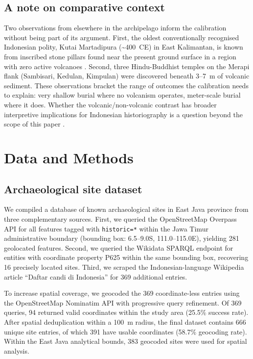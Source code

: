 \documentclass[12pt,a4paper]{article}
\begin{document}
\subsection{A note on comparative context}

Two observations from elsewhere in the archipelago inform the calibration without being part of its argument. First, the oldest conventionally recognised Indonesian polity, Kutai Martadipura (\textasciitilde400~CE) in East Kalimantan, is known from inscribed stone pillars found near the present ground surface in a region with zero active volcanoes \citep{vogel1918,coedes1968,miksic2004}. Second, three Hindu-Buddhist temples on the Merapi flank (Sambisari, Kedulan, Kimpulan) were discovered beneath 3--7~m of volcanic sediment. These observations bracket the range of outcomes the calibration needs to explain: very shallow burial where no volcanism operates, meter-scale burial where it does. Whether the volcanic/non-volcanic contrast has broader interpretive implications for Indonesian historiography is a question beyond the scope of this paper \citep[see][]{amien_synthesis_forthcoming}.


\section{Data and Methods}

\subsection{Archaeological site dataset}

We compiled a database of known archaeological sites in East Java province from three complementary sources. First, we queried the OpenStreetMap Overpass API for all features tagged with \texttt{historic=*} within the Jawa Timur administrative boundary (bounding box: 6.5--9.0\textdegree{}S, 111.0--115.0\textdegree{}E), yielding 281 geolocated features. Second, we queried the Wikidata SPARQL endpoint for entities with coordinate property P625 within the same bounding box, recovering 16 precisely located sites. Third, we scraped the Indonesian-language Wikipedia article ``Daftar candi di Indonesia'' for 369 additional entries.

To increase spatial coverage, we geocoded the 369 coordinate-less entries using the OpenStreetMap Nominatim API with progressive query refinement. Of 369 queries, 94 returned valid coordinates within the study area (25.5\% success rate). After spatial deduplication within a 100~m radius, the final dataset contains 666 unique site entries, of which 391 have usable coordinates (58.7\% geocoding rate). Within the East Java analytical bounds, 383 geocoded sites were used for spatial analysis.
\end{document}
